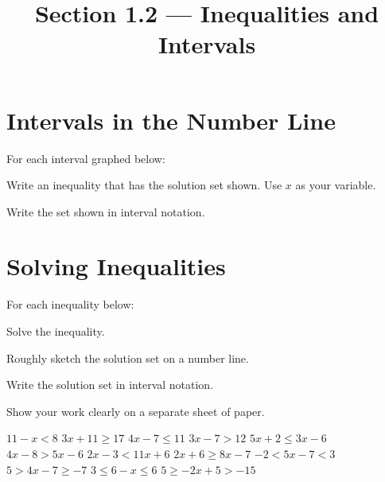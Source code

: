

\title{Section 1.2 --- Inequalities and Intervals}

\newcommand{\sets}{\ensuremath{\mathbb{N}\quad\mathbb{Z}\quad\mathbb{Q}\quad\mathbb{R}}}
\newcommand{\picksets}[1]{$#1\hfill\sets\qquad$}


\maketitle

\section*{Intervals in the Number Line}
For each interval graphed below:
\begin{clist}
\item Write an inequality that has the solution set shown. Use $x$ as your variable.
\item Write the set shown in interval notation.
\end{clist}
%
\begin{smenum}
\mitemxx
{}
{}
\mitemxx
{}
{}
\mitemxx
{}
{}
\mitemxx
{}
{}
\end{smenum}

\section*{Solving Inequalities}
For each inequality below:
\begin{clist}
\item Solve the inequality.
\item Roughly sketch the solution set on a number line.
\item Write the solution set in interval notation.
\end{clist}
Show your work clearly on a separate sheet of paper.
\begin{smenum}
\mitemxxxx
{$11-x<8$}
{$3x+11\geq 17$}
{$4x-7\leq 11$}
{$3x-7>12$}
\mitemxxxx
{$5x+2\leq 3x-6$}
{$4x-8>5x-6$}
{$2x-3<11x+6$}
{$2x+6\geq 8x-7$}
\mitemxxxx
{$-2<5x-7<3$}
{$5>4x-7\geq -7$}
{$3\leq 6-x\leq 6$}
{$5\geq -2x+5>-1 5$}
\end{smenum}

